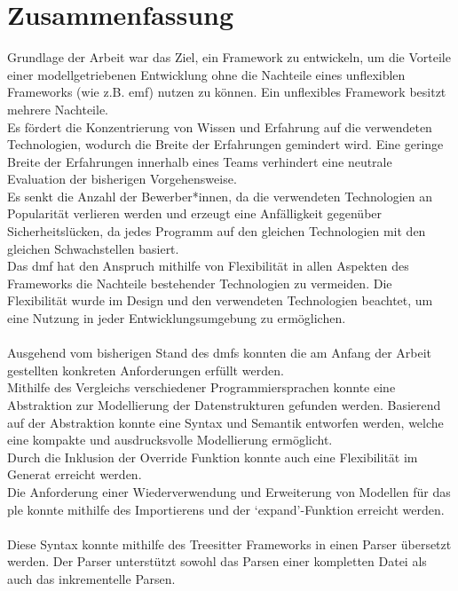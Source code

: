 \documentclass[./einleitung.tex]{subfiles}
\begin{document}
\chapter{Zusammenfassung}\label{ch:zusammenfassung}
Grundlage der Arbeit war das Ziel, ein Framework zu entwickeln, um die Vorteile einer modellgetriebenen Entwicklung
ohne die Nachteile eines unflexiblen Frameworks (wie z.B. \acrshort{emf}) nutzen zu können.
Ein unflexibles Framework besitzt mehrere Nachteile.\\
Es fördert die Konzentrierung von Wissen und Erfahrung auf die verwendeten Technologien, wodurch die Breite der Erfahrungen gemindert wird.
Eine geringe Breite der Erfahrungen innerhalb eines Teams verhindert eine neutrale Evaluation der bisherigen Vorgehensweise.\\
Es senkt die Anzahl der Bewerber*innen, da die verwendeten Technologien an Popularität verlieren werden und erzeugt eine Anfälligkeit gegenüber Sicherheitslücken,
da jedes Programm auf den gleichen Technologien mit den gleichen Schwachstellen basiert.\\
Das \acrshort{dmf} hat den Anspruch mithilfe von Flexibilität in allen Aspekten des Frameworks die Nachteile bestehender Technologien zu vermeiden.
Die Flexibilität wurde im Design und den verwendeten Technologien beachtet, um eine Nutzung in jeder Entwicklungsumgebung zu ermöglichen.
\\\\
Ausgehend vom bisherigen Stand des \acrshort{dmf}s konnten die am Anfang der Arbeit gestellten konkreten Anforderungen erfüllt werden.\\
Mithilfe des Vergleichs verschiedener Programmiersprachen konnte eine Abstraktion zur Modellierung der Datenstrukturen gefunden werden.
Basierend auf der Abstraktion konnte eine Syntax und Semantik entworfen werden, welche eine kompakte und ausdrucksvolle Modellierung ermöglicht.\\
Durch die Inklusion der Override Funktion konnte auch eine Flexibilität im Generat erreicht werden.\\
Die Anforderung einer Wiederverwendung und Erweiterung von Modellen für das \acrshort{ple} konnte mithilfe des Importierens und der `expand'-Funktion erreicht werden.
\\\\
Diese Syntax konnte mithilfe des Treesitter Frameworks in einen Parser übersetzt werden.
Der Parser unterstützt sowohl das Parsen einer kompletten Datei als auch das inkrementelle Parsen.\\
\end{document}
